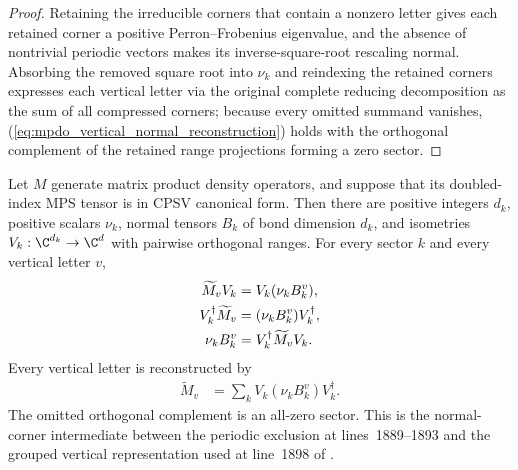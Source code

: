 \begin{proof}
    \leanok
    Retaining the irreducible corners that contain a nonzero letter gives each
    retained corner a positive Perron--Frobenius eigenvalue, and the absence
    of nontrivial periodic vectors makes its inverse-square-root rescaling
    normal. Absorbing the removed square root into $\nu_k$ and reindexing the
    retained corners expresses each vertical letter via the original complete
    reducing decomposition as the sum of all compressed corners; because every
    omitted summand vanishes, (\ref{eq:mpdo_vertical_normal_reconstruction})
    holds with the orthogonal complement of the retained range projections
    forming a zero sector.
\end{proof}

\begin{lemma}
    \label{thm:mpdo_literal_normal_vertical_corners}
    \leanok
    Let $M$ generate matrix product density operators, and suppose that its
    doubled-index MPS tensor is in CPSV canonical form. Then there are
    positive integers $d_k$, positive scalars $\nu_k$, normal tensors $B_k$ of
    bond dimension $d_k$, and isometries
    $V_k:\C^{d_k}\to\C^d$ with pairwise orthogonal ranges. For every sector
    $k$ and every vertical letter $v$,
    \begin{align}
        \widetilde M_vV_k         & =V_k(\nu_kB_k^v),
        \notag                                                     \\
        V_k^\dagger\widetilde M_v & =(\nu_kB_k^v)V_k^\dagger,
        \notag                                                     \\
        \nu_kB_k^v                & =V_k^\dagger\widetilde M_vV_k.
        \notag
    \end{align}
    Every vertical letter is reconstructed by
    \begin{align}
        \widetilde M_v
         & =\sum_kV_k(\nu_kB_k^v)V_k^\dagger.
        \label{eq:mpdo_literal_normal_vertical_reconstruction}
    \end{align}
    The omitted orthogonal complement is an all-zero sector. This is the
    normal-corner intermediate between the periodic exclusion at
    lines~1889--1893 and the grouped vertical representation used at line~1898
    of \cite[Proposition~4.13]{Cirac2016MPDO_arXiv}.
\end{lemma}

